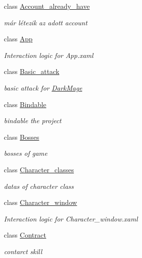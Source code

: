 \begin{DoxyCompactItemize}
\item 
class \hyperlink{class_lightdeath_1_1_account__already__have}{Account\+\_\+already\+\_\+have}
\begin{DoxyCompactList}\small\item\em már létezik az adott account \end{DoxyCompactList}\item 
class \hyperlink{class_lightdeath_1_1_app}{App}
\begin{DoxyCompactList}\small\item\em Interaction logic for App.\+xaml \end{DoxyCompactList}\item 
class \hyperlink{class_lightdeath_1_1_basic__attack}{Basic\+\_\+attack}
\begin{DoxyCompactList}\small\item\em basic attack for \hyperlink{class_lightdeath_1_1_dark_mage}{Dark\+Mage} \end{DoxyCompactList}\item 
class \hyperlink{class_lightdeath_1_1_bindable}{Bindable}
\begin{DoxyCompactList}\small\item\em bindable the project \end{DoxyCompactList}\item 
class \hyperlink{class_lightdeath_1_1_bosses}{Bosses}
\begin{DoxyCompactList}\small\item\em bosses of game \end{DoxyCompactList}\item 
class \hyperlink{class_lightdeath_1_1_character__classes}{Character\+\_\+classes}
\begin{DoxyCompactList}\small\item\em datas of character class \end{DoxyCompactList}\item 
class \hyperlink{class_lightdeath_1_1_character__window}{Character\+\_\+window}
\begin{DoxyCompactList}\small\item\em Interaction logic for Character\+\_\+window.\+xaml \end{DoxyCompactList}\item 
class \hyperlink{class_lightdeath_1_1_contract}{Contract}
\begin{DoxyCompactList}\small\item\em contarct skill \end{DoxyCompactList}\item 

\end{DoxyCompactItemize}
